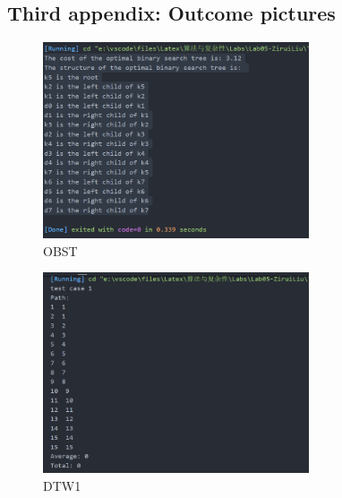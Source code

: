 \documentclass[12pt,a4paper]{article}
\theoremstyle{definition}
\begin{document}
\begin{appendices}
\section{Third appendix: Outcome pictures}

\begin{figure}[H] %
\centering %
\includegraphics[width=0.7\textwidth]{1.png} %
\caption{OBST} %
\label{} %
\end{figure}

\begin{figure}[H] %
\centering %
\includegraphics[width=0.7\textwidth]{2.png} %
\caption{DTW1} %
\label{} %
\end{figure}


\end{appendices}
\end{document}
